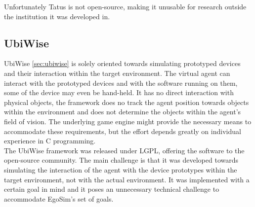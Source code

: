 
Unfortunately Tatus is not open-source, making it unusable for research outside the institution it was developed in.\\

\subsection{UbiWise}\label{subsec:discussion_ubiwise}
UbiWise \ref{sec:ubiwise} is solely oriented towards simulating prototyped devices and their interaction within the target environment. The virtual agent can interact with the prototyped devices and with the software running on them, some of the device may even be hand-held. It has no direct interaction with physical objects, the framework does no track the agent position towards objects within the environment and does not determine the objects within the agent's field of vision. The underlying game engine might provide the necessary means to accommodate these requirements, but the effort depends greatly on individual experience in C programming.\\

The UbiWise framework was released under LGPL\cite{lgpl}, offering the software to the open-source community. The main challenge is that it was developed towards simulating the interaction of the agent with the device prototypes within the target environment, not with the actual environment. It was implemented with a certain goal in mind and it poses an unnecessary technical challenge to accommodate EgoSim's set of goals.\\
